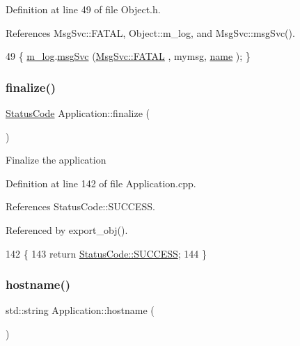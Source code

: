 Definition at line 49 of file Object.\+h.



References Msg\+Svc\+::\+F\+A\+T\+AL, Object\+::m\+\_\+log, and Msg\+Svc\+::msg\+Svc().


\begin{DoxyCode}
49 \{ \hyperlink{classObject_a0d269813dd7ac1f24bc143031e2963f2}{m\_log}.\hyperlink{classMsgSvc_ad25f18047920cc59a314e5098259711c}{msgSvc} (\hyperlink{classMsgSvc_ae671eb7301996cd049d2da8a65925926a59c73cb29edfc9cdf35845e2b1301363}{MsgSvc::FATAL}   , mymsg, \hyperlink{classObject_a300f4c05dd468c7bb8b3c968868443c1}{name} ); \}
\end{DoxyCode}
\mbox{\label{classApplication_a5e2b592eebe6f2f8780d2c129bf14560}} 
\subsubsection{\texorpdfstring{finalize()}{finalize()}}
{\footnotesize\ttfamily \hyperlink{classStatusCode}{Status\+Code} Application\+::finalize (\begin{DoxyParamCaption}{ }\end{DoxyParamCaption})}

Finalize the application 

Definition at line 142 of file Application.\+cpp.



References Status\+Code\+::\+S\+U\+C\+C\+E\+SS.



Referenced by export\+\_\+obj().


\begin{DoxyCode}
142                                    \{
143   \textcolor{keywordflow}{return} \hyperlink{classStatusCode_a6f565cbeadc76d14c72f047e5e85eb4badd0da38d3ba0d922efd1f4619bc37ad8}{StatusCode::SUCCESS};
144 \}
\end{DoxyCode}
\mbox{\label{classApplication_a095248805e26b553466b7fafc6517d8f}} 
\subsubsection{\texorpdfstring{hostname()}{hostname()}}
{\footnotesize\ttfamily std\+::string Application\+::hostname (\begin{DoxyParamCaption}{ }\end{DoxyParamCaption})\hspace{0.3cm}{\ttfamily [inline]}}

